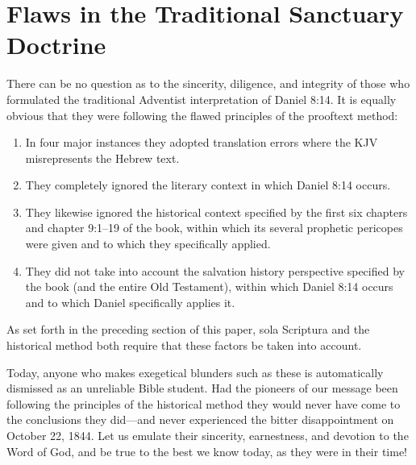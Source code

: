 \chapter{Flaws in the Traditional Sanctuary Doctrine}
\label{ch:flaws}

There can be no question as to the sincerity, diligence, and integrity of
those who formulated the traditional Adventist interpretation of
Daniel 8:14. It is equally obvious that they were following the flawed
principles of the prooftext method:
\begin{enumerate}
	\item In four major instances they adopted
translation errors where the KJV misrepresents the Hebrew text. 
	\item They
completely ignored the literary context in which Daniel 8:14 occurs.
	\item They likewise ignored the historical context specified by the first six
chapters and chapter 9:1--19 of the book, within which its several prophetic
pericopes were given and to which they specifically applied.
	\item They did not take into account the salvation history perspective 
specified by the 
book (and the entire Old Testament), within which Daniel 8:14 occurs and
to which Daniel specifically applies it.
\end{enumerate}
As set forth in the preceding
section of this paper, sola Scriptura and the historical method both require
that these factors be taken into account.

Today, anyone who makes exegetical blunders such as these is automatically
dismissed as an unreliable Bible student. Had the pioneers of our message
been following the principles of the historical method they would never have
come to the conclusions they did---and never experienced the bitter
disappointment on October 22, 1844. Let us emulate their sincerity,
earnestness, and devotion to the Word of God, and be true to the best we
know today, as they were in their time!

